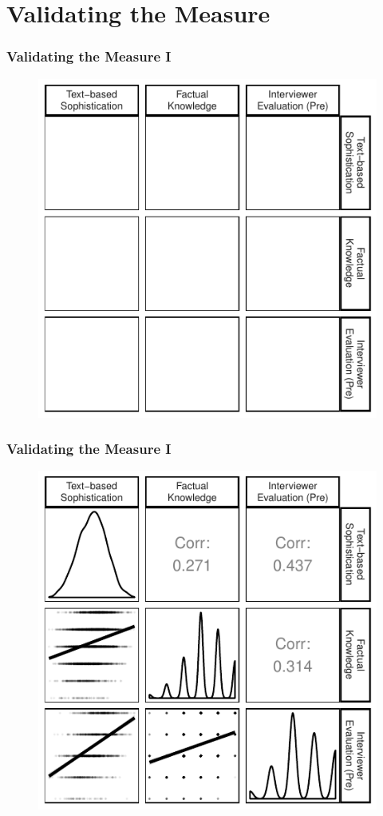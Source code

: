 \documentclass{beamer}
\begin{document}
\section{Validating the Measure}

\begin{frame} %
\frametitle{Validating the Measure I}
  \begin{figure}
  \includegraphics{../fig/corplot_empty.pdf}
  \end{figure}
\end{frame}
\begin{frame} %
\frametitle{Validating the Measure I}
  \begin{figure}
  \includegraphics{../fig/corplot_pres.pdf}
  \end{figure}
\end{frame}
\end{document}
